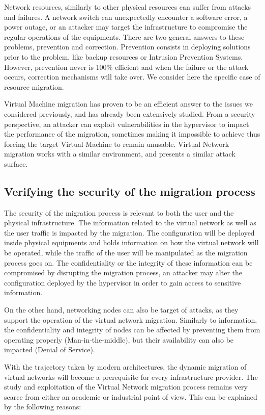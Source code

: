 Network resources, similarly to other physical resources can suffer from attacks and failures. A network switch can unexpectedly encounter a software error, a power outage, or an attacker may target the infrastructure to compromise the regular operations of the equipments. There are two general answers to these problems, prevention and correction. Prevention consists in deploying solutions prior to the problem, like backup resources or Intrusion Prevention Systems.
However, prevention never is 100\% efficient and when the failure or the attack occurs, correction mechanisms will take over. We consider here the specific case of resource migration.

Virtual Machine migration has proven to be an efficient answer to the issues we considered previously, and has already been extensively studied. From a security perspective, an attacker can exploit vulnerabilities in the hypervisor to impact the performance of the migration, sometimes making it impossible to achieve thus forcing the target Virtual Machine to remain unusable.
Virtual Network migration works with a similar environment, and presents a similar attack surface.


\subsection{Verifying the security of the migration process}
The security of the migration process is relevant to both the user and the physical infrastructure.
The information related to the virtual network as well as the user traffic is impacted by the migration. The configuration will be deployed inside physical equipments and holds information on how the virtual network will be operated, while the traffic of the user will be manipulated as the migration process goes on.
The confidentiality or the integrity of these information can be compromised by disrupting the migration process,  an attacker may alter the configuration deployed by the hypervisor in order to gain access to sensitive information.

On the other hand, networking nodes can also be target of attacks, as they support the operation of the virtual network migration.
Similarly to information, the confidentiality and integrity of nodes can be affected by preventing them from operating properly (\eg  Man-in-the-middle), but their availability can also be impacted (\eg Denial of Service).

With the trajectory taken by modern architectures, the dynamic migration of virtual networks will become a prerequisite for every infrastructure provider.
The study and exploitation of the Virtual Network migration process remains very scarce from either an academic or industrial point of view. This can be explained by the following reasons:

